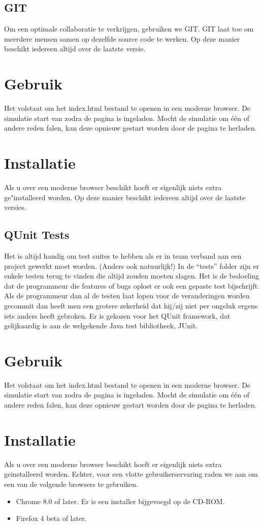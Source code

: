 \documentclass[a4paper,oneside]{report}
\begin{document}
\subsection{GIT}
Om een optimale collaboratie te verkrijgen, gebruiken we GIT.
GIT laat toe om meerdere mensen samen op dezelfde source code te werken.
Op deze manier beschikt iedereen altijd over de laatste versie.

\section{Gebruik}
Het volstaat om het index.html bestand te openen in een moderne browser. De simulatie start van zodra de pagina is ingeladen.
Mocht de simulatie om \'{e}\'{e}n of andere reden falen, kan deze opnieuw gestart worden door de pagina te herladen.
\section{Installatie}
Als u over een moderne browser beschikt hoeft er eigenlijk niets extra ge"installeerd worden.
Op deze manier beschikt iedereen altijd over de laatste versies.
\subsection{QUnit Tests}
Het is altijd handig om test suites te hebben als er in team verband aan een project gewerkt moet worden. (Anders ook natuurlijk!)
In de ``tests'' folder zijn er enkele testen terug te vinden die altijd zouden moeten slagen.
Het is de bedoeling dat de programmeur die features of bugs oplost er ook een gepaste test bijschrijft.
Als de programmeur dan al de testen laat lopen voor de veranderingen worden gecommit dan heeft men een 
grotere zekerheid dat hij/zij niet per ongeluk ergens iets anders heeft gebroken.
Er is gekozen voor het QUnit framework, dat gelijkaardig is aan de welgekende Java test bibliotheek, JUnit.

\section{Gebruik}
Het volstaat om het index.html bestand te openen in een moderne browser. De simulatie start van zodra de pagina is ingeladen.
Mocht de simulatie om één of andere reden falen, kan deze opnieuw gestart worden door de pagina te herladen.
\section{Installatie}
Als u over een moderne browser beschikt hoeft er eigenlijk niets extra geinstalleerd worden.
Echter, voor een vlotte gebruikerservaring raden we aan om een van de volgende browsers te gebruiken.
\begin{itemize}
\item Chrome 8.0 of later. Er is een installer bijgevoegd op de CD-ROM.
\item Firefox 4 beta of later.
\end{itemize}
\end{document}
